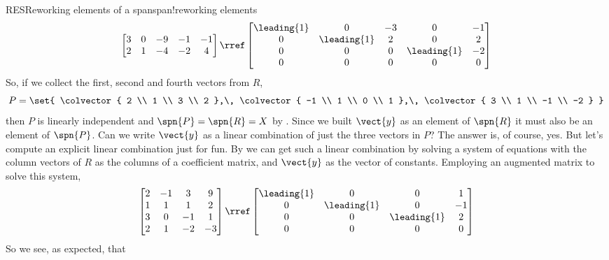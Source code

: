 \begin{example}{RES}{Reworking elements of a span}{span!reworking elements}
\begin{equation*}
\begin{bmatrix}
 3 & 0 & -9 & -1 & -1 \\
 2 & 1 & -4 & -2 & 4
\end{bmatrix}
\rref
\begin{bmatrix}
 \leading{1} & 0 & -3 & 0 & -1 \\
 0 & \leading{1} & 2 & 0 & 2 \\
 0 & 0 & 0 & \leading{1} & -2 \\
 0 & 0 & 0 & 0 & 0
\end{bmatrix}
\end{equation*}
%
So, if we collect the first, second and fourth vectors from $R$,
%
\begin{equation*}
P=\set{
\colvector{ 2 \\ 1 \\ 3 \\ 2 },\,
\colvector{ -1 \\ 1 \\ 0 \\ 1 },\,
\colvector{ 3 \\ 1 \\ -1 \\ -2 }
}\end{equation*}
%
then $P$ is linearly independent and $\spn{P}=\spn{R}=X$ by .  Since we built $\vect{y}$ as an element of $\spn{R}$ it must also be an element of $\spn{P}$.  Can we write $\vect{y}$ as a linear combination of just the three vectors in $P$?  The answer is, of course, yes.  But let's compute an explicit linear combination just for fun.  By  we can get such a linear combination by solving a system of equations with the column vectors of $R$ as the columns of a coefficient matrix, and $\vect{y}$ as the vector of constants.  Employing an augmented matrix to solve this system,
%
\begin{equation*}
\begin{bmatrix}
 2 & -1 & 3 & 9 \\
 1 & 1 & 1 & 2 \\
 3 & 0 & -1 & 1 \\
 2 & 1 & -2 & -3
\end{bmatrix}
\rref
\begin{bmatrix}
 \leading{1} & 0  & 0 & 1 \\
 0 & \leading{1} & 0 & -1 \\
 0 & 0 & \leading{1} & 2 \\
 0 & 0 & 0 & 0
\end{bmatrix}
\end{equation*}
%
So we see, as expected, that

\end{example}

